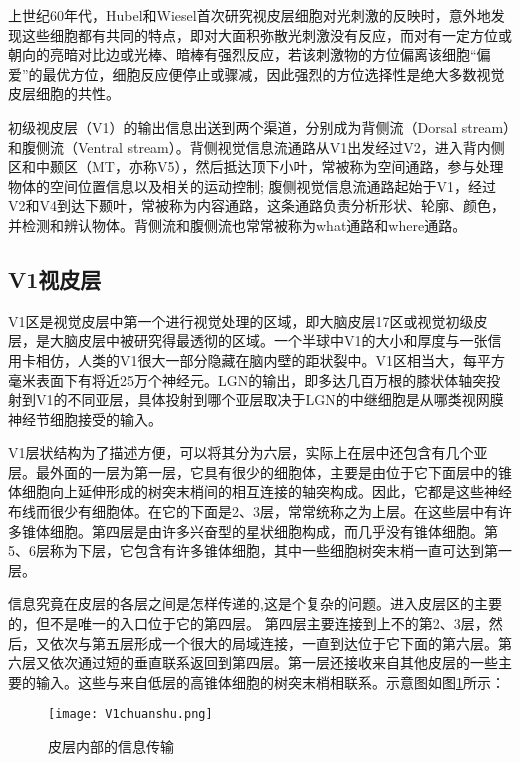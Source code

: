 \documentclass[a4paper,10pt]{article}\large
\begin{document}
上世纪60年代，Hubel和Wiesel首次研究视皮层细胞对光刺激的反映时，意外地发现\cite{16:book}这些细胞都有共同的特点，即对大面积弥散光刺激没有反应，而对有一定方位或朝向的亮暗对比边或光棒、暗棒有强烈反应，若该刺激物的方位偏离该细胞“偏爱”的最优方位，细胞反应便停止或骤减，因此强烈的方位选择性是绝大多数视觉皮层细胞的共性。


初级视皮层（V1）的输出信息出送到两个渠道\cite{6:article}，分别成为背侧流（Dorsal stream）和腹侧流（Ventral stream）。背侧视觉信息流通路从V1出发经过V2，进入背内侧区和中颞区（MT，亦称V5），然后抵达顶下小叶，常被称为空间通路，参与处理物体的空间位置信息以及相关的运动控制; 腹侧视觉信息流通路起始于V1，经过V2和V4到达下颞叶，常被称为内容通路，这条通路负责分析形状、轮廓、颜色，并检测和辨认物体。背侧流和腹侧流也常常被称为what通路和where通路\cite{15:book}。


\subsection{V1视皮层}


V1区\cite{16:book}是视觉皮层中第一个进行视觉处理的区域，即大脑皮层17区或视觉初级皮层，是大脑皮层中被研究得最透彻的区域。一个半球中V1的大小和厚度与一张信用卡相仿，人类的V1很大一部分隐藏在脑内壁的距状裂中。V1区相当大，每平方毫米表面下有将近25万个神经元\cite{8:article}。LGN的输出，即多达几百万根的膝状体轴突投射到V1的不同亚层，具体投射到哪个亚层取决于LGN的中继细胞是从哪类视网膜神经节细胞接受的输入。


V1层状结构为了描述方便，可以将其分为六层\cite{15:book}，实际上在层中还包含有几个亚层。最外面的一层为第一层，它具有很少的细胞体，主要是由位于它下面层中的锥体细胞向上延伸形成的树突末梢间的相互连接的轴突构成。因此，它都是这些神经布线而很少有细胞体。在它的下面是2、3层，常常统称之为上层。在这些层中有许多锥体细胞。第四层是由许多兴奋型的星状细胞构成，而几乎没有锥体细胞。第5、6层称为下层，它包含有许多锥体细胞，其中一些细胞树突末梢一直可达到第一层。


信息究竟在皮层的各层之间是怎样传递的,这是个复杂的问题。进入皮层区的主要的，但不是唯一的入口位于它的第四层\cite{16:book}。 第四层主要连接到上不的第2、3层，然后，又依次与第五层形成一个很大的局域连接，一直到达位于它下面的第六层。第六层又依次通过短的垂直联系返回到第四层。第一层还接收来自其他皮层的一些主要的输入。这些与来自低层的高锥体细胞的树突末梢相联系。示意图如图\ref{fig 9}所示：


\begin{figure}[htb]
\centering
\texttt{[image: V1chuanshu.png]}
\caption{皮层内部的信息传输}\label{fig 9} 
\end{figure}
\end{document}

